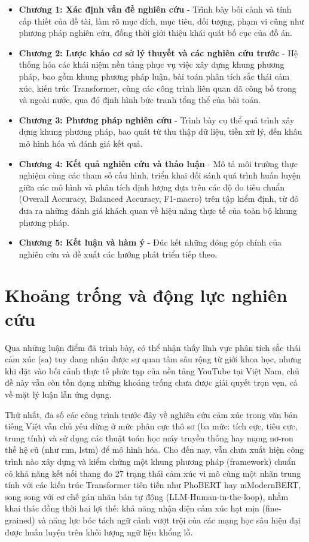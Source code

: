 \begin{itemize}
    \item \textbf{Chương 1: Xác định vấn đề nghiên cứu} - Trình bày bối cảnh và tính cấp thiết của đề tài, làm rõ mục đích, mục tiêu, đối tượng, phạm vi cũng như phương pháp nghiên cứu, đồng thời giới thiệu khái quát bố cục của đồ án.
    \item \textbf{Chương 2: Lược khảo cơ sở lý thuyết và các nghiên cứu trước} - Hệ thống hóa các khái niệm nền tảng phục vụ việc xây dựng khung phương pháp, bao gồm khung phương pháp luận, bài toán phân tích sắc thái cảm xúc, kiến trúc Transformer, cùng các công trình liên quan đã công bố trong và ngoài nước, qua đó định hình bức tranh tổng thể của bài toán.
    \item \textbf{Chương 3: Phương pháp nghiên cứu} - Trình bày cụ thể quá trình xây dựng khung phương pháp, bao quát từ thu thập dữ liệu, tiền xử lý, đến khâu mô hình hóa và đánh giá kết quả.
    \item \textbf{Chương 4: Kết quả nghiên cứu và thảo luận} - Mô tả môi trường thực nghiệm cùng các tham số cấu hình, triển khai đối sánh quá trình huấn luyện giữa các mô hình và phân tích định lượng dựa trên các độ đo tiêu chuẩn (Overall Accuracy, Balanced Accuracy, F1-macro) trên tập kiểm định, từ đó đưa ra những đánh giá khách quan về hiệu năng thực tế của toàn bộ khung phương pháp.
    \item \textbf{Chương 5: Kết luận và hàm ý} - Đúc kết những đóng góp chính của nghiên cứu và đề xuất các hướng phát triển tiếp theo.
\end{itemize}

\section{Khoảng trống và động lực nghiên cứu}

Qua những luận điểm đã trình bày, có thể nhận thấy lĩnh vực phân tích sắc thái cảm xúc (\acrshort{sa}) tuy đang nhận được sự quan tâm sâu rộng từ giới khoa học, nhưng khi đặt vào bối cảnh thực tế phức tạp của nền tảng YouTube tại Việt Nam, chủ đề này vẫn còn tồn đọng những khoảng trống chưa được giải quyết trọn vẹn, cả về mặt lý luận lẫn ứng dụng.

Thứ nhất, đa số các công trình trước đây về nghiên cứu cảm xúc trong văn bản tiếng Việt vẫn chủ yếu dừng ở mức phân cực thô sơ (ba mức: tích cực, tiêu cực, trung tính) và sử dụng các thuật toán học máy truyền thống hay mạng nơ-ron thế hệ cũ (như \acrshort{rnn}, \acrshort{lstm}) để mô hình hóa. Cho đến nay, vẫn chưa xuất hiện công trình nào xây dựng và kiểm chứng một khung phương pháp (framework) chuẩn có khả năng kết nối thang đo 27 trạng thái cảm xúc vi mô cùng một nhãn trung tính với các kiến trúc Transformer tiên tiến như PhoBERT hay mModernBERT, song song với cơ chế gán nhãn bán tự động (LLM-Human-in-the-loop), nhằm khai thác đồng thời hai lợi thế: khả năng nhận diện cảm xúc hạt mịn (fine-grained) và năng lực bóc tách ngữ cảnh vượt trội của các mạng học sâu hiện đại được huấn luyện trên khối lượng ngữ liệu khổng lồ.

